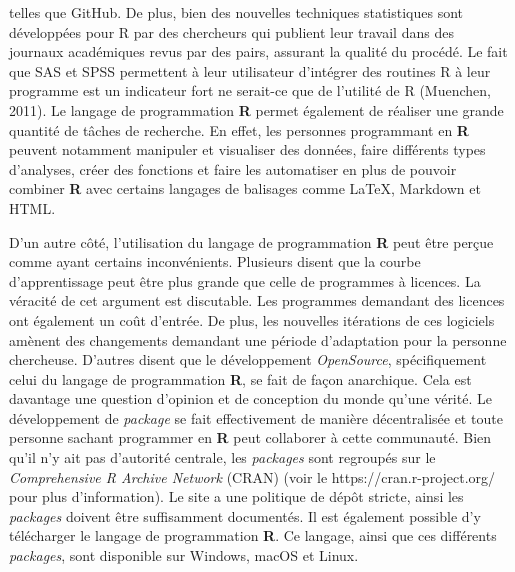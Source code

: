 \documentclass[
  letterpaper,
  DIV=11,
  numbers=noendperiod]{scrreprt}
\begin{document}
telles que GitHub. De plus, bien des nouvelles techniques statistiques
sont développées pour R par des chercheurs qui publient leur travail
dans des journaux académiques revus par des pairs, assurant la qualité
du procédé. Le fait que SAS et SPSS permettent à leur utilisateur
d'intégrer des routines R à leur programme est un indicateur fort ne
serait-ce que de l'utilité de R (Muenchen, 2011). Le langage de
programmation \textbf{R} permet également de réaliser une grande
quantité de tâches de recherche. En effet, les personnes programmant en
\textbf{R} peuvent notamment manipuler et visualiser des données, faire
différents types d'analyses, créer des fonctions et faire les
automatiser en plus de pouvoir combiner \textbf{R} avec certains
langages de balisages comme LaTeX, Markdown et HTML.

D'un autre côté, l'utilisation du langage de programmation \textbf{R}
peut être perçue comme ayant certains inconvénients. Plusieurs disent
que la courbe d'apprentissage peut être plus grande que celle de
programmes à licences. La véracité de cet argument est discutable. Les
programmes demandant des licences ont également un coût d'entrée. De
plus, les nouvelles itérations de ces logiciels amènent des changements
demandant une période d'adaptation pour la personne chercheuse. D'autres
disent que le développement \emph{OpenSource}, spécifiquement celui du
langage de programmation \textbf{R}, se fait de façon anarchique. Cela
est davantage une question d'opinion et de conception du monde qu'une
vérité. Le développement de \emph{package} se fait effectivement de
manière décentralisée et toute personne sachant programmer en \textbf{R}
peut collaborer à cette communauté. Bien qu'il n'y ait pas d'autorité
centrale, les \emph{packages} sont regroupés sur le \emph{Comprehensive
R Archive Network} (CRAN) (voir le https://cran.r-project.org/ pour plus
d'information). Le site a une politique de dépôt stricte, ainsi les
\emph{packages} doivent être suffisamment documentés. Il est également
possible d'y télécharger le langage de programmation \textbf{R}. Ce
langage, ainsi que ces différents \emph{packages}, sont disponible sur
Windows, macOS et Linux.
\end{document}
